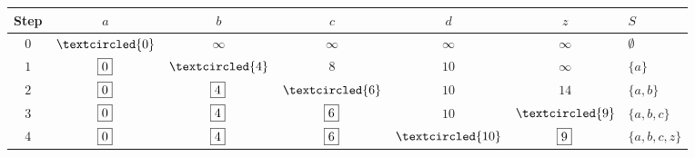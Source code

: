\documentclass{article}
\begin{document}
        \begin{center}

        \begin{tabular}{c||c|c|c|c|c||l} 
        Step & $a$ & $b$ & $c$ & $d$ & $z$ & $S$\\

        \hline 
        $0$ & $\textcircled{0}$ & $\infty$ & $\infty$ & $\infty$ & $\infty$ & $\emptyset$\\
        $1$ & $\fbox{0}$ & $\textcircled{4}$ & $8$ & $10$ & $\infty$ & $\{a\}$\\
        $2$ & $\fbox{0}$ & $\fbox{4}$ & $\textcircled{6}$ & $10$ & $14$ & $\{a,b\}$\\
        $3$ & $\fbox{0}$ & $\fbox{4}$ & $\fbox{6}$ & $10$ & $\textcircled{9}$ & $\{a,b,c\}$\\
        $4$ & $\fbox{0}$ & $\fbox{4}$ & $\fbox{6}$ & $\textcircled{10}$ & $\fbox{9}$ & $\{a,b,c,z\}$\\
        
        \end{tabular}
        
        \end{center}
\end{document}
